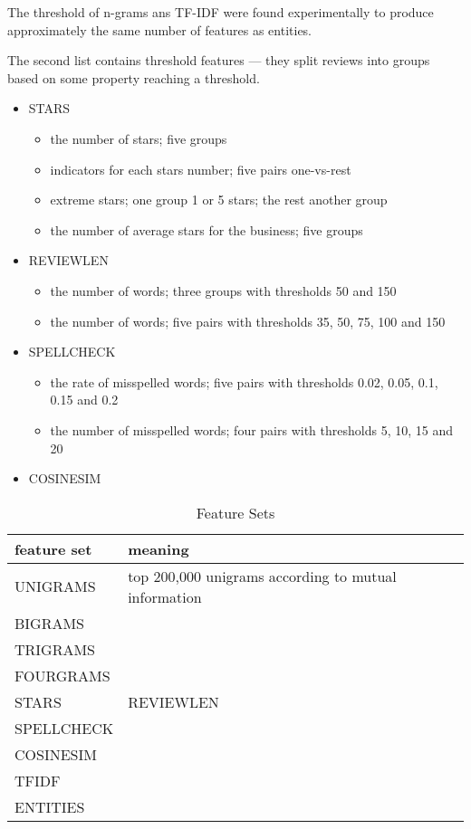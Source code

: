 The threshold of n-grams ans TF-IDF were found experimentally to produce approximately the same number of features as entities.

The second list contains threshold features --- they split reviews into groups based on some property reaching a threshold.

\begin{itemize}
	\item STARS 
		\begin{itemize}
			\item the number of stars; five groups
			\item indicators for each stars number; five pairs one-vs-rest
			\item extreme stars; one group 1 or 5 stars; the rest another group
			\item the number of average stars for the business; five groups
		\end{itemize}
	\item REVIEWLEN 
		\begin{itemize}
			\item the number of words; three groups with thresholds 50 and 150
			\item the number of words; five pairs with thresholds 35, 50, 75, 100 and 150
		\end{itemize}
	\item SPELLCHECK 
		\begin{itemize}
			\item the rate of misspelled words; five pairs with thresholds 0.02, 0.05, 0.1, 0.15 and 0.2
			\item the number of misspelled words; four pairs with thresholds 5, 10, 15 and 20
		\end{itemize}
	
	\item COSINESIM 
\end{itemize}


\begin{table}[h]
\centering
\begin{tabular}{lll}
\toprule
\textbf{feature set} & \textbf{meaning}\\
\midrule
UNIGRAMS & top 200,000 unigrams according to mutual information \\
BIGRAMS & \\
TRIGRAMS & \\
FOURGRAMS & \\
STARS & 
REVIEWLEN & \\
SPELLCHECK & \\
COSINESIM & \\
TFIDF & \\
ENTITIES & \\
\bottomrule
\end{tabular}

\caption{Feature Sets}\label{tab:fea_set}
\end{table}

